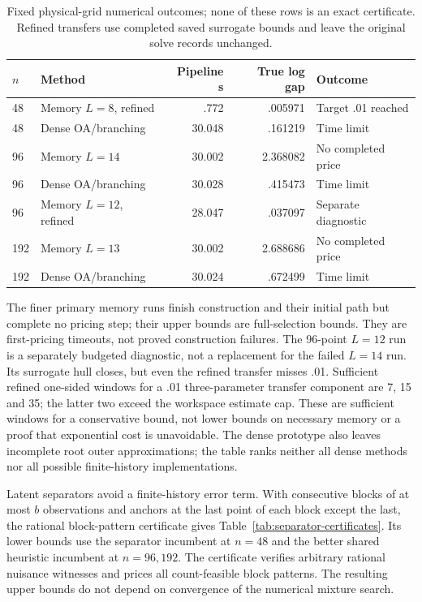 \begin{table}[htbp]
\centering\small
\caption{Fixed physical-grid numerical outcomes; none of these rows is an
exact certificate. Refined transfers use completed saved surrogate bounds and
leave the original solve records unchanged.}
\label{tab:physical-grid}
\begin{tabular}{llrrl}
\toprule
$n$ & Method & Pipeline s & True log gap & Outcome\\
\midrule
48 & Memory $L=8$, refined & .772 & .005971 & Target .01 reached\\
48 & Dense OA/branching & 30.048 & .161219 & Time limit\\
96 & Memory $L=14$ & 30.002 & 2.368082 & No completed price\\
96 & Dense OA/branching & 30.028 & .415473 & Time limit\\
96 & Memory $L=12$, refined & 28.047 & .037097 & Separate diagnostic\\
192 & Memory $L=13$ & 30.002 & 2.688686 & No completed price\\
192 & Dense OA/branching & 30.024 & .672499 & Time limit\\
\bottomrule
\end{tabular}
\end{table}

The finer primary memory runs finish construction and their initial path but
complete no pricing step; their upper bounds are full-selection bounds.
They are first-pricing timeouts, not proved construction failures.
The 96-point $L=12$ run is a separately budgeted diagnostic, not a replacement
for the failed $L=14$ run. Its surrogate hull closes, but even the refined
transfer misses .01. Sufficient refined one-sided windows for a .01
three-parameter transfer component are 7, 15 and 35; the latter two exceed the
workspace estimate cap. These are sufficient windows for a conservative bound,
not lower bounds on necessary memory or a proof that exponential cost is
unavoidable. The dense prototype also leaves incomplete root outer
approximations; the table ranks neither all dense methods nor all possible
finite-history implementations.

Latent separators avoid a finite-history error term. With consecutive blocks
of at most $b$ observations and anchors at the last point of each block except
the last, the rational block-pattern certificate gives
Table~\ref{tab:separator-certificates}. Its lower bounds use the separator
incumbent at $n=48$ and the better shared heuristic incumbent at $n=96,192$.
The certificate verifies arbitrary rational nuisance witnesses and prices all
count-feasible block patterns. The resulting upper bounds do not depend on
convergence of the numerical mixture search.

